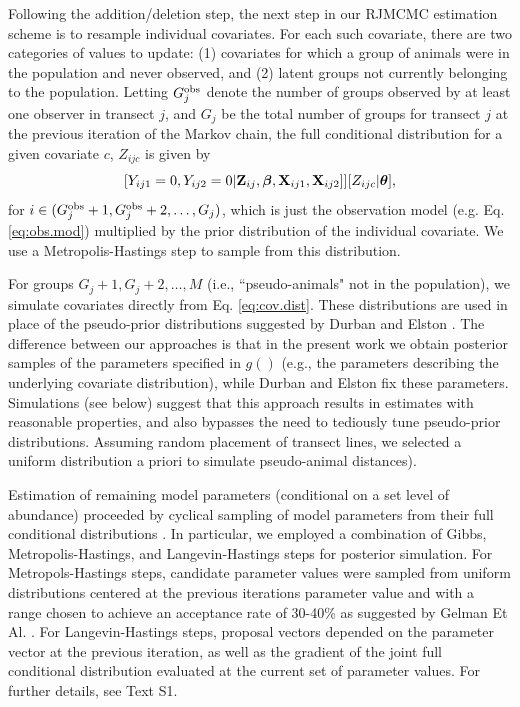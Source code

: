 \documentclass[10pt]{article}
\begin{document}
Following the addition/deletion step, the next step in our RJMCMC estimation scheme is to resample individual covariates.  For each such covariate, there are two categories of values to update: (1) covariates for which a group of animals were in the population and never observed, and (2) latent groups not currently belonging to the population. Letting $G_j^{\rm obs}$ denote the number of groups observed by at least one observer in transect $j$, and $G_j$ be the total number of groups for transect $j$ at the previous iteration of the Markov chain, the full conditional distribution for a given covariate $c$, $Z_{ijc}$ is given by
$$
[Y_{ij1}=0,Y_{ij2}=0|{\bf Z}_{ij},\boldsymbol{\beta},{\bf X}_{ij1},{\bf X}_{ij2}]][Z_{ijc}|\boldsymbol{\theta}],
$$
for $i \in (G_j^{\rm obs}+1,G_{j}^{\rm obs}+2,\hdots,G_j)$,
which is just the observation model (e.g. Eq. \ref{eq:obs.mod}) multiplied by the prior distribution of the individual covariate.  We use a Metropolis-Hastings step to sample from this distribution.

For groups $G_j+1,G_j+2, \hdots,M$ (i.e., ``pseudo-animals" not in the population), we simulate covariates directly from Eq. \ref{eq:cov.dist}.  These distributions are used in place of the pseudo-prior distributions suggested by Durban and Elston \cite{DurbanElston2005}.  The difference between our approaches is that in the present work we obtain posterior samples of the parameters specified in  $g()$ (e.g., the parameters describing the underlying covariate distribution), while Durban and Elston fix these parameters.  Simulations (see below) suggest that this approach results in estimates with reasonable properties, and also bypasses the need to tediously tune pseudo-prior distributions.  Assuming random placement of transect lines, we selected a uniform distribution a priori to simulate pseudo-animal distances).

Estimation of remaining model parameters (conditional on a set level of abundance)  proceeded by cyclical sampling of model parameters from their full conditional distributions \cite{GelmanEtAl2004}.  In particular, we employed a combination of Gibbs, Metropolis-Hastings, and Langevin-Hastings \cite{RobertCasella2004} steps for posterior simulation.  For Metropols-Hastings steps, candidate parameter values were sampled from uniform distributions centered at the previous iterations parameter value and with a range chosen to achieve an acceptance rate of 30-40\% as suggested by Gelman Et Al. \cite{GelmanEtAl2004}.  For Langevin-Hastings steps, proposal vectors depended on the parameter vector at the previous iteration, as well as the gradient of the joint full conditional distribution evaluated at the current set of parameter values.  For further details, see Text S1.
\end{document}
